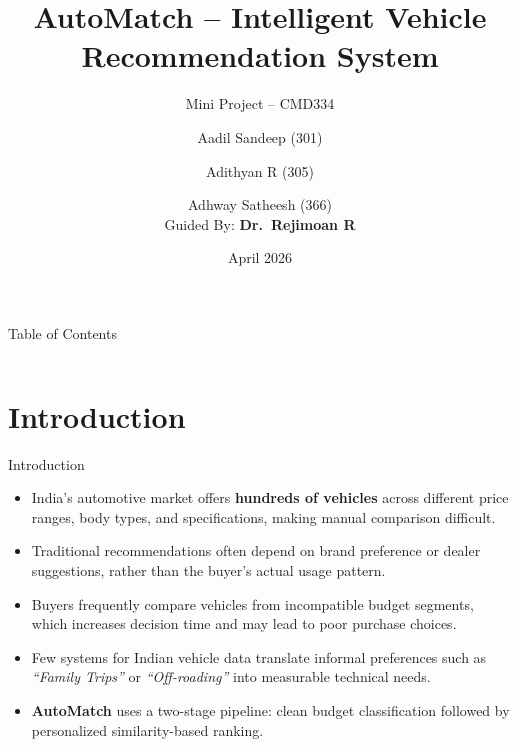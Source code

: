 \documentclass[aspectratio=169]{beamer}
\title[AutoMatch]{AutoMatch -- Intelligent Vehicle Recommendation System}
\subtitle{Mini Project -- CMD334}
\author[Aadil | Adithyan | Adhway]{%
  Aadil Sandeep (301) \and Adithyan R (305) \and Adhway Satheesh (366)\\[0.4em]
  \small Guided By: \textbf{Dr.\ Rejimoan R}
}
\institute[SCTCE]{%
  B.Tech CSE -- AI \& ML Specialization\\
  Sree Chitra Thirunal College of Engineering, Thiruvananthapuram
}
\date{April 2026}
\begin{document}

\begin{frame}
  \titlepage
\end{frame}

\begin{frame}{Table of Contents}
  \begin{columns}[t]
      \tableofcontents[sections={1-6}]
      \tableofcontents[sections={7-12}]
  \end{columns}
\end{frame}

\section{Introduction}
\begin{frame}{Introduction}
  \begin{itemize}
    \setlength\itemsep{0.6em}
    \item India's automotive market offers \textbf{hundreds of vehicles} across different
          price ranges, body types, and specifications, making manual comparison difficult.
    \item Traditional recommendations often depend on \alert{brand preference or dealer
          suggestions}, rather than the buyer's actual usage pattern.
    \item Buyers frequently compare vehicles from incompatible budget segments, which
          increases decision time and may lead to poor purchase choices.
    \item Few systems for Indian vehicle data translate informal preferences such as
          \textit{``Family Trips''} or \textit{``Off-roading''} into measurable technical needs.
    \item \textbf{AutoMatch} uses a two-stage pipeline: clean budget classification followed
          by personalized similarity-based ranking.
  \end{itemize}
\end{frame}

\end{document}
